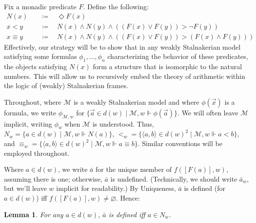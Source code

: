 \documentclass[12pt]{article}
\newtheorem{lemma}{Lemma}
\newcommand{\tup}[1]{\langle #1 \rangle}
\newcommand{\would}{\mathbin{>}}
\newcommand{\pos}{\mathop{\Diamond}}
\begin{document}
Fix a monadic predicate $F$. 
Define the following:
\begin{align*}
    N(x) & \quad \coloneqq \quad \pos F(x) \\
    x < y & \quad \coloneqq \quad N(x) \wedge N(y) \wedge ((F(x) \vee F(y)) \would \neg F(y)) \\
    x \equiv y & \quad \coloneqq \quad N(x) \wedge N(y) \wedge ((F(x) \vee F(y)) \would (F(x) \wedge F(y))) 
\end{align*}
Effectively, our strategy will be to show that in any weakly Stalnakerian model satisfying some formulas $\phi_1,\dots,\phi_n$ characterizing the behavior of these predicates, the objects satisfying $N(x)$ form a structure that is isomorphic to the natural numbers. 
This will allow us to recursively embed the theory of arithmetic within the logic of (weakly) Stalnakerian frames. 

Throughout, where $\mathcal{M}$ is a weakly Stalnakerian model and where $\phi(\vec{x})$ is a formula, we write $\phi_{\mathcal{M},w}$ for $\{\vec{a} \in d(w) \mid \mathcal{M},w \Vdash \phi(\vec{a})\}$. 
We will often leave $\mathcal{M}$ implicit, writing $\phi_w$ when $\mathcal{M}$ is understood. 
Thus, $N_w = \{a \in d(w) \mid \mathcal{M},w \Vdash N(a)\}$, $<_w = \{\tup{a,b} \in d(w)^2 \mid \mathcal{M},w \Vdash a < b\}$, and $\equiv_w = \{\tup{a,b} \in d(w)^2 \mid \mathcal{M},w \Vdash a \equiv b\}$. 
Similar conventions will be employed throughout. 


Where $a \in d(w)$, we write $\bar{a}$ for the unique member of $f([F(a)],w)$, assuming there is one; otherwise, $\bar{a}$ is undefined. 
(Technically, we should write $\bar{a}_w$, but we'll leave $w$ implicit for readability.) 
By Uniqueness, $\bar{a}$ is defined (for $a \in d(w)$) iff $f([F(a)],w) \neq \varnothing$. 
Hence:

\begin{lemma}\label{lem:Nw}
    For any $a \in d(w)$, $\bar{a}$ is defined iff $a \in N_w$. 
\end{lemma}
\end{document}
